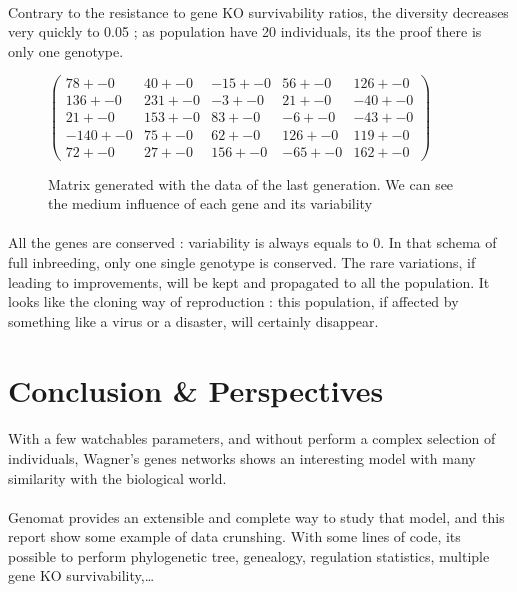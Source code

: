 \documentclass[]{report} %
\begin{document}
    \paragraph*{}
    Contrary to the resistance to gene KO survivability ratios, the diversity decreases very quickly to 0.05 ; as population have 20 individuals, its the proof there is only one genotype.

    \begin{figure}[H] 
            \centering
            \small
    $
          \begin{pmatrix}
                78 +- 0 & 40 +- 0 & -15 +- 0 & 56 +- 0 & 126 +- 0 \\
                136 +- 0 & 231 +- 0 & -3 +- 0 & 21 +- 0 & -40 +- 0 \\
                21 +- 0 & 153 +- 0 & 83 +- 0 & -6 +- 0 & -43 +- 0 \\
                -140 +- 0 & 75 +- 0 & 62 +- 0 & 126 +- 0 & 119 +- 0 \\
                72 +- 0 & 27 +- 0 & 156 +- 0 & -65 +- 0 & 162 +- 0 
           \end{pmatrix}
    $
            \caption{\footnotesize Matrix generated with the data of the last generation. We can see the medium influence of each gene and its variability}
            \label{mat:ps20xg200xprt20xmr1-10-4}
    \end{figure}
    \paragraph*{}
    All the genes are conserved : variability is always equals to 0. 
    In that schema of full inbreeding, only one single genotype is conserved. The rare variations, if leading to improvements, will be kept and propagated to all the population.
    It looks like the cloning way of reproduction : this population, if affected by something like a virus or a disaster, will certainly disappear.


\section{Conclusion \& Perspectives}
    \paragraph*{}
    With a few watchables parameters, and without perform a complex selection of individuals, 
    Wagner's genes networks shows an interesting model with many similarity with the biological world.
    \paragraph*{}
    Genomat provides an extensible and complete way to study that model, and this report show some example of data crunshing.
    With some lines of code, its possible to perform phylogenetic tree, genealogy, regulation statistics, multiple gene KO survivability,…
\end{document}
